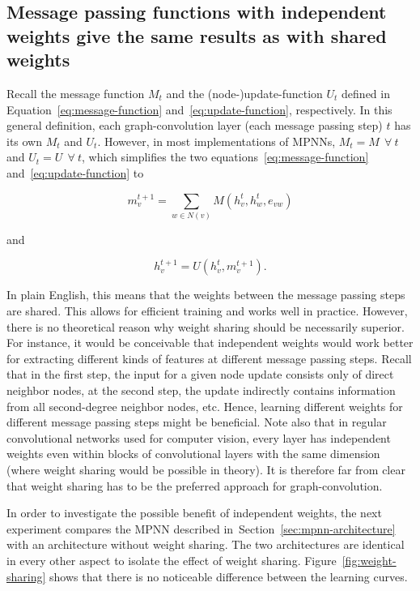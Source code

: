 \subsection{Message passing functions with independent weights give the same results as with shared weights}
\label{sec:weight-sharing}

Recall the message function $M_t$ and the (node-)update-function $U_t$ defined in Equation~\ref{eq:message-function} and~\ref{eq:update-function}, respectively. In this general definition, each graph-convolution layer (each message passing step) $t$ has its own $M_t$ and $U_t$. However, in most implementations of MPNNs, $M_t = M~~\forall~t$ and $U_t = U~~\forall~t$, which simplifies the two equations~\ref{eq:message-function} and~\ref{eq:update-function} to

\begin{equation}\label{eq:message-function-shared}
m_v^{t+1} = \sum_{w \in N(v)} M(h_v^t, h_w^t, e_{vw})
\end{equation}

and

\begin{equation}\label{eq:update-function-shared}
h_v^{t+1} = U(h_v^t, m_v^{t+1}).
\end{equation}

In plain English, this means that the weights between the message passing steps are shared. This allows for efficient training and works well in practice. However, there is no theoretical reason why weight sharing should be necessarily superior. For instance, it would be conceivable that independent weights would work better for extracting different kinds of features at different message passing steps. Recall that in the first step, the input for a given node update consists only of direct neighbor nodes, at the second step, the update indirectly contains information from all second-degree neighbor nodes, etc. Hence, learning different weights for different message passing steps might be beneficial. Note also that in regular convolutional networks used for computer vision, every layer has independent weights even within blocks of convolutional layers with the same dimension (where weight sharing would be possible in theory). It is therefore far from clear that weight sharing has to be the preferred approach for graph-convolution.

In order to investigate the possible benefit of independent weights, the next experiment compares the MPNN described in~Section~\ref{sec:mpnn-architecture} with an architecture without weight sharing. The two architectures are identical in every other aspect to isolate the effect of weight sharing. Figure~\ref{fig:weight-sharing} shows that there is no noticeable difference between the learning curves.


